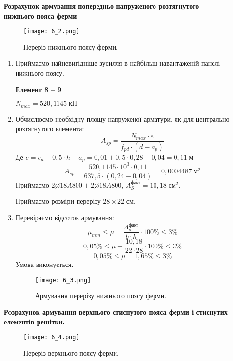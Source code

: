 \documentclass[a4paper,14pt]{article}
\begin{document}
\textbf{Розрахунок армування попередньо напруженого розтягнутого\\нижнього пояса ферми}
\begin{figure}[h!]
    \begin{center}
        \texttt{[image: 6\_2.png]}
        \caption{Переріз нижнього поясу ферми.}\label{ris6_2} 
    \end{center}
\end{figure} 
\begin{enumerate}
    \item Приймаємо найневигідніше зусилля в найбільш навантаженій панелі нижнього поясу.
    
        \textbf{Елемент 8 -- 9}

        $N_{max} = 520,1145\;\textit{кН}$
    \item Обчислюємо необхідну площу напруженої арматури, як для центрально розтягнутого елемента:
        \begin{equation}
            A_{sp} = \dfrac{N_{max} \cdot e}{f_{pd} \cdot (d - a_p)}
        \end{equation}
        Де $e = e_a + 0,5 \cdot h - a_p = 0,01 + 0,5 \cdot 0,28 - 0,04 = 0,11\;\textit{м}$
        $$A_{sp} = \dfrac{520,1145 \cdot 10^3 \cdot 0,11}{637,5 \cdot (0,24 - 0,04)} = 0,0004487\;\textit{м}^2$$
        Приймаємо $2\varnothing18A800 + 2\varnothing18A800$, $A_S^{\textit{факт}} = 10,18\;\textit{см}^2$.

        Приймаємо розміри перерізу $28 \times 22\;\textit{см}$.
    \item Перевіряємо відсоток армування:
        \begin{equation}
            \mu_{min} \leq \mu = \dfrac{A_{s}^{\textit{факт}}}{b \cdot h} \cdot 100\% \leq 3\% 
        \end{equation}
        $$0,05\% \leq \mu = \dfrac{10,18}{22 \cdot 28} \cdot 100\% \leq 3\% $$
        $$0,05\% \leq \mu = 1,65\% \leq 3\%$$
        Умова виконується.
 \begin{figure}[h!]
     \begin{center}
            \texttt{[image: 6\_3.png]}
            \caption{Армування перерізу нижнього поясу ферми.}\label{ris6_3} 
    \end{center}
 \end{figure} 
\end{enumerate}
\newpage
        \textbf{Рoзрахунок армування верхнього стиснутого пояса ферми і стиснутих елементів решітки.}
        \begin{figure}[h!]
            \begin{center}
                   \texttt{[image: 6\_4.png]}
                   \caption{Переріз верхнього поясу ферми.}\label{ris6_4} 
           \end{center}
        \end{figure}
\end{document}
